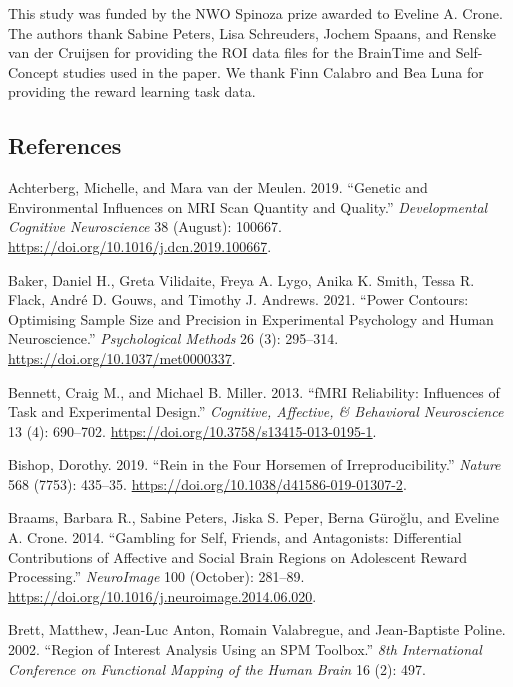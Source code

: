 \documentclass[
  letterpaper,
  DIV=11,
  numbers=noendperiod]{scrartcl}
\newlength{\cslhangindent}
\newenvironment{CSLReferences}[2] %
 {\begin{list}{}{%
  \setlength{\itemindent}{0pt}
  \setlength{\leftmargin}{0pt}
  \setlength{\parsep}{0pt}
  \ifodd #1
   \setlength{\leftmargin}{\cslhangindent}
   \setlength{\itemindent}{-1\cslhangindent}
  \fi
  \setlength{\itemsep}{#2\baselineskip}}}
 {\end{list}}
\begin{document}
This study was funded by the NWO Spinoza prize awarded to Eveline A.
Crone. The authors thank Sabine Peters, Lisa Schreuders, Jochem Spaans,
and Renske van der Cruijsen for providing the ROI data files for the
BrainTime and Self-Concept studies used in the paper. We thank Finn
Calabro and Bea Luna for providing the reward learning task data.

\subsection*{References}\label{references}

\label{refs}
\begin{CSLReferences}{1}{0}
Achterberg, Michelle, and Mara van der Meulen. 2019. {``Genetic and
Environmental Influences on MRI Scan Quantity and Quality.''}
\emph{Developmental Cognitive Neuroscience} 38 (August): 100667.
\url{https://doi.org/10.1016/j.dcn.2019.100667}.

Baker, Daniel H., Greta Vilidaite, Freya A. Lygo, Anika K. Smith, Tessa
R. Flack, André D. Gouws, and Timothy J. Andrews. 2021. {``Power
Contours: Optimising Sample Size and Precision in Experimental
Psychology and Human Neuroscience.''} \emph{Psychological Methods} 26
(3): 295--314. \url{https://doi.org/10.1037/met0000337}.

Bennett, Craig M., and Michael B. Miller. 2013. {``fMRI Reliability:
Influences of Task and Experimental Design.''} \emph{Cognitive,
Affective, \& Behavioral Neuroscience} 13 (4): 690--702.
\url{https://doi.org/10.3758/s13415-013-0195-1}.

Bishop, Dorothy. 2019. {``Rein in the Four Horsemen of
Irreproducibility.''} \emph{Nature} 568 (7753): 435--35.
\url{https://doi.org/10.1038/d41586-019-01307-2}.

Braams, Barbara R., Sabine Peters, Jiska S. Peper, Berna Güroğlu, and
Eveline A. Crone. 2014. {``Gambling for Self, Friends, and Antagonists:
Differential Contributions of Affective and Social Brain Regions on
Adolescent Reward Processing.''} \emph{NeuroImage} 100 (October):
281--89. \url{https://doi.org/10.1016/j.neuroimage.2014.06.020}.

Brett, Matthew, Jean-Luc Anton, Romain Valabregue, and Jean-Baptiste
Poline. 2002. {``Region of Interest Analysis Using an SPM Toolbox.''}
\emph{8th International Conference on Functional Mapping of the Human
Brain} 16 (2): 497.


\end{CSLReferences}
\end{document}
